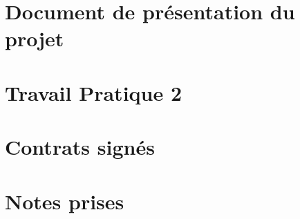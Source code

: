 \documentclass[letterpaper, oneside, 12pt, these, creativecommons]{thETS}
\begin{document}


\chapter{Document de présentation du projet}



\chapter{Travail Pratique 2}



\chapter{Contrats signés}


\chapter{Notes prises}

\end{document}
